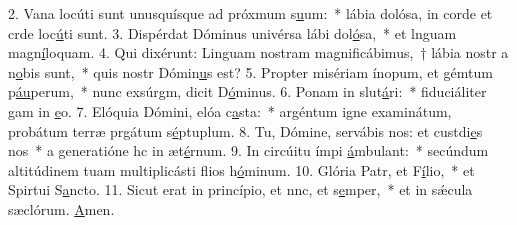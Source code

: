 2. Vana locúti sunt unusquísque ad próxmum s\uline{u}um:~* lábia dolósa, in corde et crde loc\uline{ú}ti sunt.
3. Dispérdat Dóminus univérsa lábi dol\uline{ó}sa,~* et lnguam magn\uline{í}loquam.
4. Qui dixérunt: Linguam nostram magnificábimus,~† lábia nostr a n\uline{o}bis sunt,~* quis nostr Dómin\uline{u}s est?
5. Propter misériam ínopum, et gémtum p\uline{áu}perum,~* nunc exsúrgm, dicit D\uline{ó}minus.
6. Ponam in slut\uline{á}ri:~* fiduciáliter gam in \uline{e}o.
7. Elóquia Dómini, elóa c\uline{a}sta:~* argéntum igne examinátum, probátum terræ prgátum s\uline{é}ptuplum.
8. Tu, Dómine, servábis nos: et custdi\uline{e}s nos~* a generatióne hc in æt\uline{é}rnum.
9. In circúitu ímpi \uline{á}mbulant:~* secúndum altitúdinem tuam multiplicásti flios h\uline{ó}minum.
10. Glória Patr, et F\uline{í}lio,~* et Spirtui S\uline{a}ncto.
11. Sicut erat in princípio, et nnc, et s\uline{e}mper,~* et in sǽcula sæclórum. \uline{A}men.
